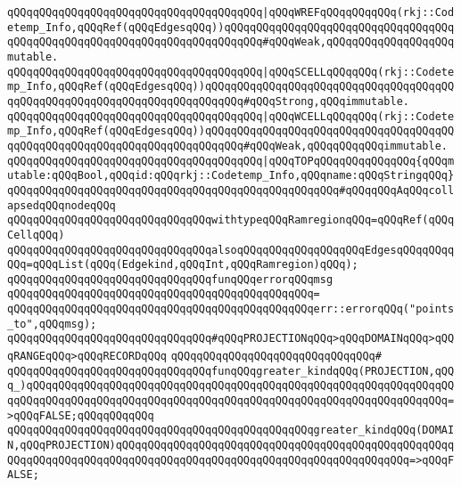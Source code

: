 \verb|qQQqqQQqqQQqqQQqqQQqqQQqqQQqqQQqqQQqqQQq|\verb#|qQQqWREFqQQqqQQqqQQq(rkj::Codetemp_Info,qQQqRef(qQQqEdgesqQQq))qQQqqQQqqQQqqQQqqQQqqQQqqQQqqQQqqQQqqQQqqQQqqQQqqQQqqQQqqQQqqQQqqQQqqQQqqQQq#\verb|#qQQqWeak,qQQqqQQqqQQqqQQqqQQqmutable.|\newline
\verb|qQQqqQQqqQQqqQQqqQQqqQQqqQQqqQQqqQQqqQQq|\verb#|qQQqSCELLqQQqqQQq(rkj::Codetemp_Info,qQQqRef(qQQqEdgesqQQq))qQQqqQQqqQQqqQQqqQQqqQQqqQQqqQQqqQQqqQQqqQQqqQQqqQQqqQQqqQQqqQQqqQQqqQQqqQQq#\verb|#qQQqStrong,qQQqimmutable.|\newline
\verb|qQQqqQQqqQQqqQQqqQQqqQQqqQQqqQQqqQQqqQQq|\verb#|qQQqWCELLqQQqqQQq(rkj::Codetemp_Info,qQQqRef(qQQqEdgesqQQq))qQQqqQQqqQQqqQQqqQQqqQQqqQQqqQQqqQQqqQQqqQQqqQQqqQQqqQQqqQQqqQQqqQQqqQQqqQQq#\verb|#qQQqWeak,qQQqqQQqqQQqimmutable.|\newline
\verb|qQQqqQQqqQQqqQQqqQQqqQQqqQQqqQQqqQQqqQQq|\verb#|qQQqTOPqQQqqQQqqQQqqQQq{qQQqmutable:qQQqBool,qQQqid:qQQqrkj::Codetemp_Info,qQQqname:qQQqStringqQQq}#\newline
\verb|qQQqqQQqqQQqqQQqqQQqqQQqqQQqqQQqqQQqqQQqqQQqqQQqqQQq#qQQqqQQqAqQQqcollapsedqQQqnodeqQQq|\newline
\newline
\verb|qQQqqQQqqQQqqQQqqQQqqQQqqQQqqQQqwithtypeqQQqRamregionqQQq=qQQqRef(qQQqCellqQQq)|\newline
\verb|qQQqqQQqqQQqqQQqqQQqqQQqqQQqqQQqalsoqQQqqQQqqQQqqQQqqQQqEdgesqQQqqQQqqQQq=qQQqList(qQQq(Edgekind,qQQqInt,qQQqRamregion)qQQq);|\newline
\newline
\verb|qQQqqQQqqQQqqQQqqQQqqQQqqQQqqQQqfunqQQqerrorqQQqmsg|\newline
\verb|qQQqqQQqqQQqqQQqqQQqqQQqqQQqqQQqqQQqqQQqqQQqqQQq=|\newline
\verb|qQQqqQQqqQQqqQQqqQQqqQQqqQQqqQQqqQQqqQQqqQQqqQQqerr::errorqQQq("points_to",qQQqmsg);|\newline
\newline
\verb|qQQqqQQqqQQqqQQqqQQqqQQqqQQqqQQq#qQQqPROJECTIONqQQq>qQQqDOMAINqQQq>qQQqRANGEqQQq>qQQqRECORDqQQq|\newline
\verb|qQQqqQQqqQQqqQQqqQQqqQQqqQQqqQQq#|\newline
\verb|qQQqqQQqqQQqqQQqqQQqqQQqqQQqqQQqfunqQQqgreater_kindqQQq(PROJECTION,qQQq_)qQQqqQQqqQQqqQQqqQQqqQQqqQQqqQQqqQQqqQQqqQQqqQQqqQQqqQQqqQQqqQQqqQQqqQQqqQQqqQQqqQQqqQQqqQQqqQQqqQQqqQQqqQQqqQQqqQQqqQQqqQQqqQQqqQQqqQQq=>qQQqFALSE;qQQqqQQqqQQq|\newline
\verb|qQQqqQQqqQQqqQQqqQQqqQQqqQQqqQQqqQQqqQQqqQQqqQQqgreater_kindqQQq(DOMAIN,qQQqPROJECTION)qQQqqQQqqQQqqQQqqQQqqQQqqQQqqQQqqQQqqQQqqQQqqQQqqQQqqQQqqQQqqQQqqQQqqQQqqQQqqQQqqQQqqQQqqQQqqQQqqQQqqQQqqQQqqQQqqQQq=>qQQqFALSE;|\newline
